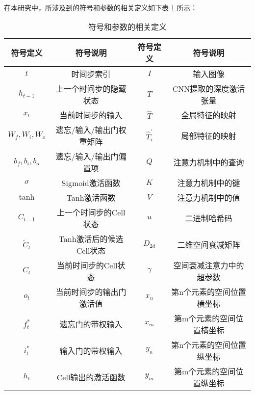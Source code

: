 在本研究中，所涉及到的符号和参数的相关定义如下表 \ref{tab:parameter_explain} 所示：

\begin{table}[h]
    \caption{符号和参数的相关定义}\label{tab:parameter_explain}
    \centering
    \resizebox{0.9\linewidth}{!}
    {\begin{tabular}{*4{c}}
    \toprule
    符号定义 & 符号说明 & 符号定义 & 符号说明 \\
    \midrule
        $t$       & 时间步索引                       & $I$           & 输入图像             \\
        $h_{t-1}$  & 上一个时间步的隐藏状态            & $T$           & CNN提取的深度激活张量     \\
        $x_t$     & 当前时间步的输入                  & $\widehat{T}$& 全局特征的映射          \\
        $W_f, W_i, W_o$ & 遗忘/输入/输出门权重矩阵     & $\widehat{T}_i^{\prime}$ & 局部特征的映射      \\
        $b_f, b_i, b_o$ & 遗忘/输入/输出门偏置项       & $Q$         & 注意力机制中的查询        \\
        $\sigma$  & Sigmoid激活函数                  & $K$         & 注意力机制中的键         \\
        $\tanh$   & Tanh激活函数                     & $V$         & 注意力机制中的值         \\
        $C_{t-1}$  & 上一个时间步的Cell状态            &   $u$       &        二进制哈希码         \\ 
        $\tilde{C}_t$ & Tanh激活后的候选Cell状态       & $D_{2d}$    & 二维空间衰减矩阵         \\
        $C_t$     & 当前时间步的Cell状态               & $\gamma$    & 空间衰减注意力中的超参数     \\
        $o_t$     & 当前时间步的输出门激活值             & $x_n$       & 第n个元素的空间位置横坐标    \\
        $f_t^*$   & 遗忘门的带权输入                   & $x_m$       & 第m个元素的空间位置横坐标    \\
        $i_t^*$   & 输入门的带权输入                   & $y_n$       & 第n个元素的空间位置纵坐标    \\
        $h_t$     & Cell输出的激活函数                 & $y_m$       & 第m个元素的空间位置纵坐标   \\
    \bottomrule
    \end{tabular}}    
    \vspace{-0.8em}
\end{table}


